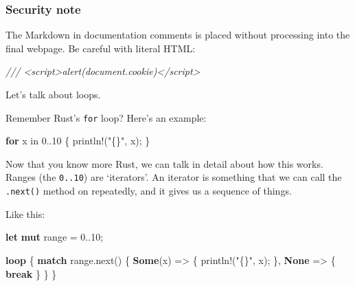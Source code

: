 \documentclass[a4paper,]{book}
\newenvironment{Shaded}{\begin{snugshade}}{\end{snugshade}}
\newcommand{\KeywordTok}[1]{\textcolor[rgb]{0.13,0.29,0.53}{\textbf{{#1}}}}
\newcommand{\DecValTok}[1]{\textcolor[rgb]{0.00,0.00,0.81}{{#1}}}
\newcommand{\StringTok}[1]{\textcolor[rgb]{0.31,0.60,0.02}{{#1}}}
\newcommand{\CommentTok}[1]{\textcolor[rgb]{0.56,0.35,0.01}{\textit{{#1}}}}
\newcommand{\OtherTok}[1]{\textcolor[rgb]{0.56,0.35,0.01}{{#1}}}
\newcommand{\NormalTok}[1]{{#1}}
\begin{document}
\subsubsection{Security note}\label{security-note}

The Markdown in documentation comments is placed without processing into
the final webpage. Be careful with literal HTML:

\begin{Shaded}
\begin{Highlighting}[]
\CommentTok{/// <script>alert(document.cookie)</script>}
\end{Highlighting}
\end{Shaded}


Let's talk about loops.

Remember Rust's \texttt{for} loop? Here's an example:

\begin{Shaded}
\begin{Highlighting}[]
\KeywordTok{for} \NormalTok{x in }\DecValTok{0.}\NormalTok{.}\DecValTok{10} \NormalTok{\{}
    \OtherTok{println!}\NormalTok{(}\StringTok{"\{\}"}\NormalTok{, x);}
\NormalTok{\}}
\end{Highlighting}
\end{Shaded}

Now that you know more Rust, we can talk in detail about how this works.
Ranges (the \texttt{0..10}) are `iterators'. An iterator is something
that we can call the \texttt{.next()} method on repeatedly, and it gives
us a sequence of things.

Like this:

\begin{Shaded}
\begin{Highlighting}[]
\KeywordTok{let} \KeywordTok{mut} \NormalTok{range = }\DecValTok{0.}\NormalTok{.}\DecValTok{10}\NormalTok{;}

\KeywordTok{loop} \NormalTok{\{}
    \KeywordTok{match} \NormalTok{range.next() \{}
        \KeywordTok{Some}\NormalTok{(x) => \{}
            \OtherTok{println!}\NormalTok{(}\StringTok{"\{\}"}\NormalTok{, x);}
        \NormalTok{\},}
        \KeywordTok{None} \NormalTok{=> \{ }\KeywordTok{break} \NormalTok{\}}
    \NormalTok{\}}
\NormalTok{\}}
\end{Highlighting}
\end{Shaded}
\end{document}
